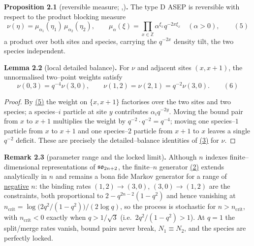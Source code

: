 \documentclass[11pt]{article}
\theoremstyle{plain}
\theoremstyle{definition}
\theoremstyle{remark}
\newcommand{\Z}{\mathbb{Z}}\newcommand{\R}{\mathbb{R}}\newcommand{\N}{\mathbb{N}}
\begin{document}
\label{prop_measure}\noindent\textbf{Proposition 2.1} (reversible measure; {\cite[Prop.~1.3]{KLLPZ}},{\cite[\S3.1]{REU}})\textbf{.} 
The type D ASEP is reversible with respect to the product blocking measure
\label{eq_nu}
\begin{equation}
  \nu(\eta)=\mu_{\alpha_1}(\eta_1)\,\mu_{\alpha_2}(\eta_2),\qquad
  \mu_\alpha(\xi)=\prod_{x\in\Z}\alpha^{\xi_x}q^{-2x\xi_x}\quad(\alpha>0),\qquad(5)
\end{equation}
a product over both sites and species, carrying the $q^{-2x}$ density tilt, the two
species independent.
\par

\label{lem_db}\noindent\textbf{Lemma 2.2} (local detailed balance)\textbf{.} 
For $\nu$ and adjacent sites $(x,x+1)$, the unnormalised two--point weights satisfy
\label{eq_dbrel}
\begin{equation}
  \nu(0,3)=q^{-4}\nu(3,0),\qquad \nu(1,2)=\nu(2,1)=q^{-2}\nu(3,0).\qquad(6)
\end{equation}
\par
\begin{proof}
By \hyperref[eq_nu]{(5)} the weight on $\{x,x+1\}$ factorises over the two sites and two
species; a species--$i$ particle at site $y$ contributes $\alpha_i q^{-2y}$. Moving the
bound pair from $x$ to $x+1$ multiplies the weight by $q^{-2}\cdot q^{-2}=q^{-4}$;
moving one species--$1$ particle from $x$ to $x+1$ and one species--$2$ particle from
$x+1$ to $x$ leaves a single $q^{-2}$ deficit. These are precisely the
detailed--balance identities of \hyperref[eq_rates]{(3)} for $\nu$.
\end{proof}

\label{rem_range}\noindent\textbf{Remark 2.3} (parameter range and the locked limit)\textbf{.} 
Although $n$ indexes finite--dimensional representations of $\mathfrak{so}_{2n+2}$, the
finite--$n$ generator \hyperref[eq_nrates]{(2)} extends analytically in $n$ and remains a
bona fide Markov generator for a range of \underline{negative} $n$: the binding rates
$(1,2)\to(3,0)$, $(3,0)\to(1,2)$ are the constraints, both proportional to
$2-q^{2n-2}(1-q^2)$ and hence vanishing at
$n_{\mathrm{crit}}=\log\!\big(2q^2/(1-q^2)\big)/(2\log q)$, so the process is stochastic
for $n>n_{\mathrm{crit}}$, with $n_{\mathrm{crit}}<0$ exactly when $q>1/\sqrt3$ (i.e.\
$2q^2/(1-q^2)>1$). At
$q=1$ the split/merge rates vanish, bound pairs never break, $N_1\equiv N_2$, and the
species are perfectly locked.
\par
\end{document}
